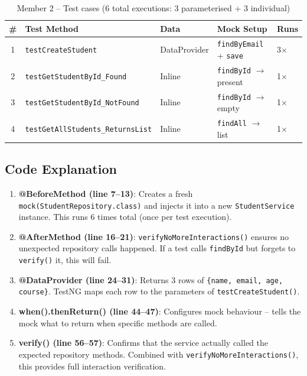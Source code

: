 \documentclass[12pt,a4paper]{article}
\begin{document}
\begin{table}[h!]
\centering
\begin{tabular}{cllll}
    \toprule
    \textbf{\#} & \textbf{Test Method} & \textbf{Data} & \textbf{Mock Setup} & \textbf{Runs} \\
    \midrule
    1 & \texttt{testCreateStudent} & DataProvider & \texttt{findByEmail} + \texttt{save} & 3$\times$ \\
    2 & \texttt{testGetStudentById\_Found} & Inline & \texttt{findById} $\rightarrow$ present & 1$\times$ \\
    3 & \texttt{testGetStudentById\_NotFound} & Inline & \texttt{findById} $\rightarrow$ empty & 1$\times$ \\
    4 & \texttt{testGetAllStudents\_ReturnsList} & Inline & \texttt{findAll} $\rightarrow$ list & 1$\times$ \\
    \bottomrule
\end{tabular}
\caption{Member 2 -- Test cases (6 total executions: 3 parameterised + 3 individual)}
\end{table}

\subsection{Code Explanation}

\begin{enumerate}
    \item \textbf{@BeforeMethod (line 7--13)}: Creates a fresh \texttt{mock(StudentRepository.class)} and injects it into a new \texttt{StudentService} instance. This runs 6 times total (once per test execution).
    \item \textbf{@AfterMethod (line 16--21)}: \texttt{verifyNoMoreInteractions()} ensures no unexpected repository calls happened. If a test calls \texttt{findById} but forgets to \texttt{verify()} it, this will fail.
    \item \textbf{@DataProvider (line 24--31)}: Returns 3 rows of \texttt{\{name, email, age, course\}}. TestNG maps each row to the parameters of \texttt{testCreateStudent()}.
    \item \textbf{when().thenReturn() (line 44--47)}: Configures mock behaviour -- tells the mock what to return when specific methods are called.
    \item \textbf{verify() (line 56--57)}: Confirms that the service actually called the expected repository methods. Combined with \texttt{verifyNoMoreInteractions()}, this provides full interaction verification.
\end{enumerate}
\end{document}
